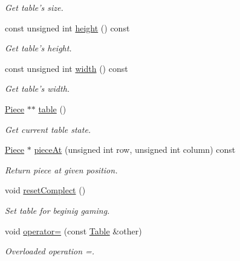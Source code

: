 \begin{DoxyCompactItemize}
\begin{DoxyCompactList}\small\item\em Get table's size. \item\end{DoxyCompactList}\item 
const unsigned int \hyperlink{classChEngn_1_1Table_a9502a1090bcb852c162934a792c2360a}{height} () const 
\begin{DoxyCompactList}\small\item\em Get table's height. \item\end{DoxyCompactList}\item 
const unsigned int \hyperlink{classChEngn_1_1Table_a6aaaaae9343e67a947b0cdeb6104361b}{width} () const 
\begin{DoxyCompactList}\small\item\em Get table's width. \item\end{DoxyCompactList}\item 
\hyperlink{classChEngn_1_1Piece}{Piece} $\ast$$\ast$ \hyperlink{classChEngn_1_1Table_a7e403087a7979907ca171e20462f8346}{table} ()
\begin{DoxyCompactList}\small\item\em Get current table state. \item\end{DoxyCompactList}\item 
\hyperlink{classChEngn_1_1Piece}{Piece} $\ast$ \hyperlink{classChEngn_1_1Table_afd9b5d81da9d90ee6fcae57651f08d40}{pieceAt} (unsigned int row, unsigned int column) const 
\begin{DoxyCompactList}\small\item\em Return piece at given position. \item\end{DoxyCompactList}\item 
void \hyperlink{classChEngn_1_1Table_a8ece9e9f9f28f209d72f16db0fb2aeed}{resetComplect} ()
\begin{DoxyCompactList}\small\item\em Set table for beginig gaming. \item\end{DoxyCompactList}\item 
void \hyperlink{classChEngn_1_1Table_a5b45cb67e40f75358145826e72b319b4}{operator=} (const \hyperlink{classChEngn_1_1Table}{Table} \&other)
\begin{DoxyCompactList}\small\item\em Overloaded operation =. \item\end{DoxyCompactList}\end{DoxyCompactItemize}
